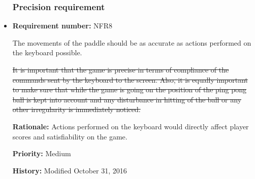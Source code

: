 \documentclass[12pt,letterpaper]{article}
\begin{document}
\begin{reqbox}
	\begin{itemize}

\subsubsection{Precision requirement}

\item \textbf{Requirement number: }NFR8

		The movements of the paddle should be as accurate as actions performed on the keyboard possible.

\st{   	It is important that the game is precise in terms of compliance of the commands sent by the keyboard to the screen. Also, it is equally important to make sure that while the game is going on the position of the ping pong ball is kept into account and any disturbance in hitting of the ball or any other irregularity is immediately noticed.\\
}

		\textbf{Rationale: } Actions performed on the keyboard would directly affect player scores and satisfiability on the game.

		\textbf{Priority: }Medium

		\textbf{History: }Modified October 31, 2016

	\end{itemize}
\end{reqbox}
\end{document}
